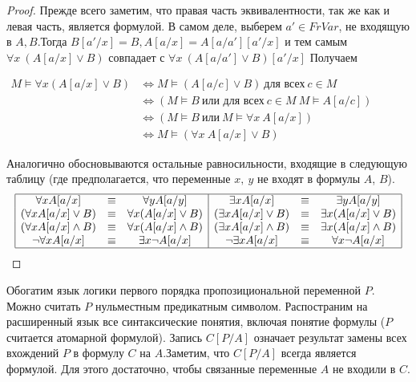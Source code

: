 \begin{proof}
	 Прежде всего заметим, что правая часть эквивалентности, так же как и левая часть, является формулой. В самом
	 деле, выберем $a'\in FrVar$, не входящую в $A,B$.Тогда $B[a'/x]=B,A[a/x]=A[a/a'][a'/x]$ и тем самым $\forall x
	 \:(A[a/x]\lor B)$ совпадает с  $\forall x\:(A[a/a']\lor B)[a'/x]$ Получаем
     \begin{center}
         $\begin{aligned}
    M \vDash \forall x(A[a / x] \vee B) & \Longleftrightarrow M \vDash(A[a / c] \vee B) \ \text{для всех} \ c \in M \\
    & \Longleftrightarrow(M \vDash B \ \text{или для всех} \ c \in M \ M \vDash A[a / c]) \\
    & \Longleftrightarrow(M \vDash B \ \text{или} \ M \vDash \forall x \  A[a / x]) \\
    & \Longleftrightarrow M \vDash (\forall x \  A[a / x] \vee B)
    \end{aligned}$
     \end{center}
	 Аналогично обосновываются остальные равносильности, входящие в следующую таблицу (где предполагается, что
	 переменные $x, \ y$ не входят в формулы $A$, $B$).\\
$$
\begin{array}{|ccc|ccc|}
\hline \forall x A[a / x] & {\equiv} & {\forall y A[a / y]} & {\exists x A[a / x]} & {\equiv} & {\exists y A[a / y]} \\
{(\forall x A[a / x] \vee B)} & {\equiv} & {\forall x(A[a / x] \vee B)} & {(\exists x A[a / x] \vee B)} & {\equiv}
	& {\exists x(A[a / x] \vee B)} \\
{(\forall x A[a / x] \wedge B)} & {\equiv} & {\forall x(A[a / x] \wedge B)} & {(\exists x A[a / x] \wedge B)} &
	{\equiv} & {\exists x(A[a / x] \wedge B)} \\
{\neg \forall x A[a / x]} & {\equiv} & {\exists x \neg A[a / x]} & {\neg \exists x A[a / x]} & {\equiv} & {\forall
	x \neg A[a / x]} \\
\hline
\end{array}
$$
\end{proof}
\begin{definition}
	Обогатим язык логики первого порядка пропозициональной переменной $P$. Можно считать $P$ нульместным
	предикатным символом. Распостраним на расширенный язык все синтаксические понятия, включая понятие формулы ($P$
	считается атомарной формулой). Запись $C[P/A]$ означает результат замены всех вхождений $P$ в формулу $C$ на
	$A$.Заметим, что $C[P/A]$ всегда является формулой. Для этого достаточно, чтобы связанные переменные $A$ не
	входили в $C$.
\end{definition}
